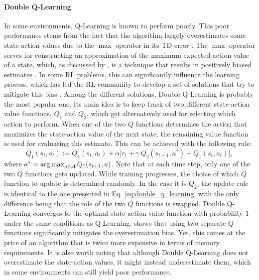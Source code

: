 \paragraph{\textbf{\uppercase{D}ouble \uppercase{Q}-\uppercase{L}earning}} In some environments, Q-Learning is known to perform poorly. This poor performance stems from the fact that the algorithm largely overestimates some state-action values due to the $\max$ operator in its TD-error \cite{thrun1993issues}. The $\max$ operator serves for constructing an approximation of the maximum expected action-value of a state, which, as discussed by \citet{hasselt2010double}, is a technique that results in positively biased estimates \cite{van2004rational,smith2006optimizer}. In some RL problems, this can significantly influence the learning process, which has led the RL community to develop a set of solutions that try to mitigate this bias \cite{lee2013bias,lee2019bias,zhu2020self,pentaliotis2021variation}. Among the different solutions, Double Q-Learning \cite{hasselt2010double} is probably the most popular one. Its main idea is to keep track of two different state-action value functions, $Q_1$ and $Q_2$, which get alternatively used for selecting which action to perform. When one of the two $Q$ functions determines the action that maximizes the state-action value of the next state, the remaining value function is used for evaluating this estimate. This can be achieved with the following rule:
\begin{equation}
	Q_1(s_t,a_t):=Q_1(s_t,a_t) + \alpha\big[r_t + \gamma \: Q_2(s_{t+1},a^{*}) - Q_1(s_t, a_t) \big],
\label{eq:double_q_learning}
\end{equation}
where $a^{*}=\operatorname*{arg\,max}_{a\in \mathcal{A}} Q_1(s_{t+1},a)$. Note that at each time step, only one of the two $Q$ functions gets updated. While training progresses, the choice of which $Q$ function to update is determined randomly. In the case it is $Q_2$, the update rule is identical to the one presented in Eq. \ref{eq:double_q_learning} with the only difference being that the role of the two $Q$ functions is swapped. Double Q-Learning converges to the optimal state-action value function with probability $1$ under the same conditions as Q-Learning. \citet{hasselt2010double} shows that using two separate $Q$ functions significantly mitigates the overestimation bias. Yet, this comes at the price of an algorithm that is twice more expensive in terms of memory requirements. It is also worth noting that although Double Q-Learning does not overestimate the state-action values, it might instead underestimate them, which in some environments can still yield poor performance.



